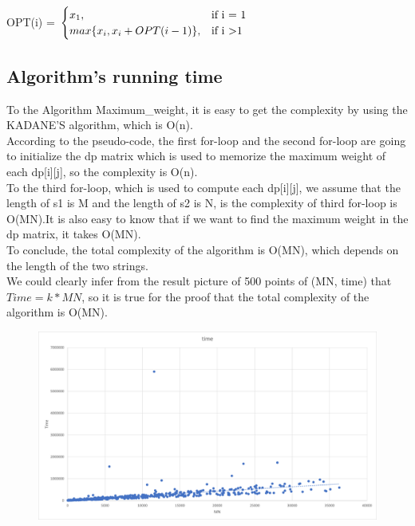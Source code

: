 \documentclass[]{article}
\begin{document}
	OPT(i) =
	$\begin{cases} 
		x_{1},  & \mbox{if }\mbox{i = 1} \\
		max\{x_{i}, x_{i} + OPT(i-1)\}, & \mbox{if }\mbox{i \textgreater 1}
	\end{cases}$
	
	\subsection{Algorithm's running time}
	
	To the Algorithm Maximum\_weight, it is easy to get the complexity by using the KADANE’S algorithm, which is O(n). \\
	
	\noindent According to the pseudo-code, the first for-loop and the second for-loop are going to initialize the dp matrix which is used to memorize the maximum weight of each dp[i][j], so the complexity is O(n).  \\
	
	\noindent To the third for-loop, which is used to compute each dp[i][j], we assume that the length of s1 is M and the length of s2 is N, is the complexity of third for-loop is O(MN).It is also easy to know that if we want to find the maximum weight in the dp matrix, it takes O(MN).  \\
	
	\noindent To conclude, the total complexity of the algorithm is O(MN), which depends on the length of the two strings.  \\
	
	\noindent We could clearly infer from the result picture of 500 points of (MN, time) that $Time = k * MN$, so it is true for the proof that the total complexity of the algorithm is O(MN). \\
	
	\begin{figure}[H]
		\centering
		\includegraphics[width=0.7\linewidth]{screen/A1-12}
		\caption{}
		\label{fig:a1-12}
	\end{figure}
	
\end{document}
